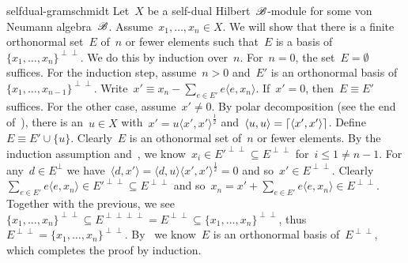 \begin{solution}{selfdual-gramschmidt}%
    Let~$X$ be a self-dual Hilbert~$\mathscr{B}$-module
        for some von Neumann algebra~$\mathscr{B}$.
    Assume~$x_1, \ldots, x_n \in X$.
We will show that there is a finite orthonormal set~$E$
    of~$n$ or fewer elements such that~$E$ is a
    basis of~$\{x_1, \ldots, x_n\}^{\perp\perp}$.
We do this by induction over~$n$.
For~$n=0$, the set~$E = \emptyset$ suffices.
For the induction step,
    assume~$n > 0$ and~$E'$ is an
    orthonormal basis of~$\{x_1, \ldots, x_{n-1}\}^{\perp\perp}$.
    Write~$x' \equiv x_n - \sum_{e\in E'} e\langle e,x_n\rangle$. 
If~$x'=0$, then~$E \equiv E'$ suffices.
For the other case, assume~$x' \neq 0$.
    By polar decomposition (see the end of~),
    there is an~$u \in X$
    with~$x' = u\langle x',x'\rangle^{\frac{1}{2}}$
    and~$\langle u, u \rangle = \left\lceil\langle x',x'\rangle\right\rceil$.
Define~$E \equiv E' \cup \{ u \}$.
Clearly~$E$ is an othonormal set of~$n$ or fewer elements.
    By the induction assumption
    and~,
    we know~$x_i \in E'^{\perp\perp} \subseteq E^{\perp\perp}$ for~$i \leq 1 \neq n-1$.
For any~$d \in E^\perp$
    we have~$\langle d, x'\rangle =
    \langle d, u \rangle \langle x',x'\rangle^{\frac{1}{2}} = 0$
    and so~$x' \in E^{\perp\perp}$.
    Clearly~$\sum_{e \in E'}e \langle e,x_n \rangle \in E'^{\perp\perp}
        \subseteq E^{\perp\perp}$
        and so~$x_n = x' + \sum_{e \in E'} e \langle e,x_n\rangle \in
            E^{\perp\perp}$.
    Together with the previous,
    we see~$\{x_1, \ldots, x_n\}^{\perp\perp} \subseteq E^{\perp\perp\perp\perp}
        = E^{\perp\perp} \subseteq \{x_1, \ldots, x_n\}^{\perp\perp}$,
        thus~$E^{\perp\perp} = \{ x_1, \ldots, x_n\}^{\perp\perp}$.
    By~
        we know~$E$ is an orthonormal basis of~$E^{\perp\perp}$,
        which completes the proof by induction.
\end{solution}
